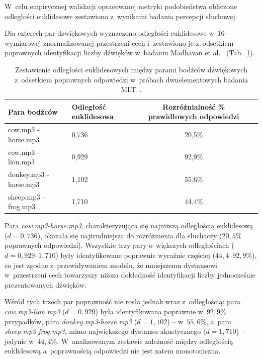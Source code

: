 \documentclass{article}
\begin{document}
W~celu empirycznej walidacji opracowanej metryki podobieństwa obliczone odległości euklidesowe zestawiono z~wynikami badania percepcji słuchowej.

Dla czterech par dzwiękowych wyznaczono odległości euklidesowe w~16-wymiarowej znormalizowanej przestrzeni cech i~zestawiono je z~odsetkiem poprawnych identyfikacji liczby dźwięków w~badaniu Madhavan et al.~\cite{MadhavanWrobel2024MLT} (Tab.~\ref{tab:mlt_walidacja}).

\begin{table}[H]
\centering
\begin{tabular}{llcc}
\toprule
Para bodźców & Odległość euklidesowa & Rozróżnialność \% prawidłowych odpowiedzi \\
\midrule
cow.mp3 - horse.mp3     & 0{,}736 & 20{,}5\% \\
cow.mp3 - lion.mp3    & 0{,}929 & 92{,}9\% \\
donkey.mp3 - horse.mp3   & 1{,}102 & 55{,}6\% \\
sheep.mp3 - frog.mp3  & 1{,}710 & 44{,}4\% \\
\bottomrule
\end{tabular}
\caption{Zestawienie odległości euklidesowych między parami bodźców dźwiękowych z~odsetkiem poprawnych odpowiedzi w~próbach dwuelementowych badania MLT~\cite{MadhavanWrobel2024MLT}.}
\label{tab:mlt_walidacja}
\end{table}

Para \textit{cow.mp3-horse.mp3}, charakteryzująca się najniższą odległością euklidesową ($d = 0{,}736$), okazała się najtrudniejsza do rozróżnienia dla słuchaczy ($20{,}5\%$ poprawnych odpowiedzi). Wszystkie trzy pary o~większych odległościach ($d = 0{,}929$--$1{,}710$) były identyfikowane poprawnie wyraźnie częściej ($44{,}4$--$92{,}9\%$), co jest zgodne z~przewidywaniem modelu, że mniejszemu dystansowi w~przestrzeni cech towarzyszy niższa dokładność identyfikacji liczby jednocześnie prezentowanych dźwięków.

Wśród tych trzech par poprawność nie rosła jednak wraz z~odległością: para \textit{cow.mp3-lion.mp3} ($d = 0{,}929$) była identyfikowana poprawnie w~$92{,}9\%$ przypadków, para \textit{donkey.mp3-horse.mp3} ($d = 1{,}102$) -- w~$55{,}6\%$, a~para \textit{sheep.mp3-frog.mp3}, mimo największego dystansu akustycznego ($d = 1{,}710$) -- jedynie w~$44{,}4\%$. W~analizowanym zestawie zależność między odległością euklidesową a~poprawnością odpowiedzi nie jest zatem monotoniczna.
\end{document}
